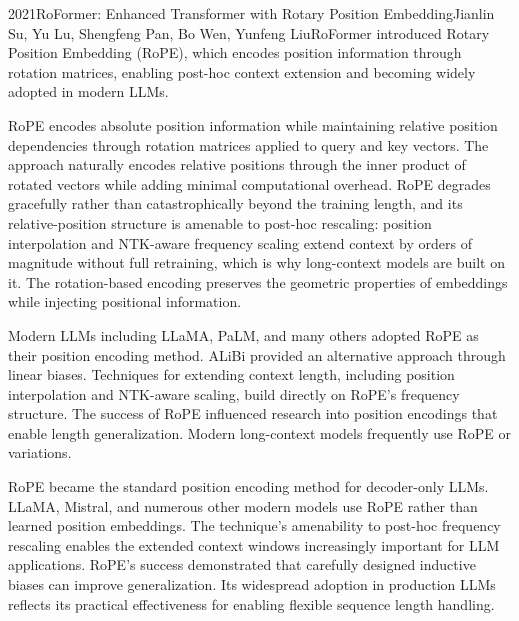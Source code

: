 
\begin{papersummary}{2021}{RoFormer: Enhanced Transformer with Rotary Position Embedding}{Jianlin Su, Yu Lu, Shengfeng Pan, Bo Wen, Yunfeng Liu}{RoFormer introduced Rotary Position Embedding (RoPE), which encodes position information through rotation matrices, enabling post-hoc context extension and becoming widely adopted in modern LLMs.}

RoPE encodes absolute position information while maintaining relative position dependencies through rotation matrices applied to query and key vectors. The approach naturally encodes relative positions through the inner product of rotated vectors while adding minimal computational overhead. RoPE degrades gracefully rather than catastrophically beyond the training length, and its relative-position structure is amenable to post-hoc rescaling: position interpolation and NTK-aware frequency scaling extend context by orders of magnitude without full retraining, which is why long-context models are built on it. The rotation-based encoding preserves the geometric properties of embeddings while injecting positional information.

Modern LLMs including LLaMA, PaLM, and many others adopted RoPE as their position encoding method. ALiBi provided an alternative approach through linear biases. Techniques for extending context length, including position interpolation and NTK-aware scaling, build directly on RoPE's frequency structure. The success of RoPE influenced research into position encodings that enable length generalization. Modern long-context models frequently use RoPE or variations.

RoPE became the standard position encoding method for decoder-only LLMs. LLaMA, Mistral, and numerous other modern models use RoPE rather than learned position embeddings. The technique's amenability to post-hoc frequency rescaling enables the extended context windows increasingly important for LLM applications. RoPE's success demonstrated that carefully designed inductive biases can improve generalization. Its widespread adoption in production LLMs reflects its practical effectiveness for enabling flexible sequence length handling.

\end{papersummary}
